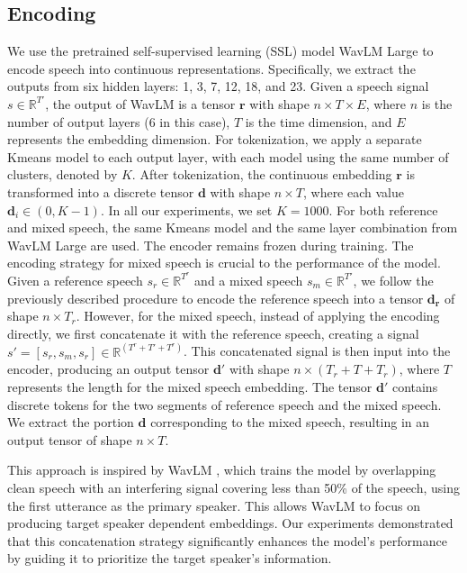 \documentclass[conference]{IEEEtran}
\begin{document}
\subsection{Encoding}

We use the pretrained self-supervised learning (SSL) model WavLM Large \cite{wavlm} to encode speech into continuous representations. Specifically, we extract the outputs from six hidden layers: 1, 3, 7, 12, 18, and 23. Given a speech signal \(s \in \mathbb{R}^{T'}\), the output of WavLM is a tensor \(\bm{r}\) with shape \(n \times T \times E\), where \(n\) is the number of output layers (6 in this case), \(T\) is the time dimension, and \(E\) represents the embedding dimension. For tokenization, we apply a separate Kmeans model to each output layer, with each model using the same number of clusters, denoted by \(K\). After tokenization, the continuous embedding \(\bm{r}\) is transformed into a discrete tensor \(\bm{d}\) with shape \(n \times T\), where each value \(\bm{d}_{i} \in (0, K-1) \). In all our experiments, we set \(K = 1000\). For both reference and mixed speech, the same Kmeans model and the same layer combination from WavLM Large are used. The encoder remains frozen during training.
The encoding strategy for mixed speech is crucial to the performance of the model. Given a reference speech \(s_r \in \mathbb{R}^{T^r}\) and a mixed speech \(s_m \in \mathbb{R}^{T'}\), we follow the previously described procedure to encode the reference speech into a tensor \(\bm{d_r}\) of shape \(n \times T_r\). However, for the mixed speech, instead of applying the encoding directly, we first concatenate it with the reference speech, creating a signal \(s' = [s_r, s_m, s_r] \in \mathbb{R}^{(T^r + T' + T^r)}\). This concatenated signal is then input into the encoder, producing an output tensor \(\bm{d'}\) with shape \(n \times (T_r + T + T_r)\), where \(T\) represents the length for the mixed speech embedding. The tensor \(\bm{d'}\) contains discrete tokens for the two segments of reference speech and the mixed speech. We extract the portion \(\bm{d}\) corresponding to the mixed speech, resulting in an output tensor of shape \(n \times T\).

This approach is inspired by WavLM \cite{wavlm}, which trains the model by overlapping clean speech with an interfering signal covering less than 50\% of the speech, using the first utterance as the primary speaker. This allows WavLM to focus on producing target speaker dependent embeddings. Our experiments demonstrated that this concatenation strategy significantly enhances the model's performance by guiding it to prioritize the target speaker's information.
\end{document}
